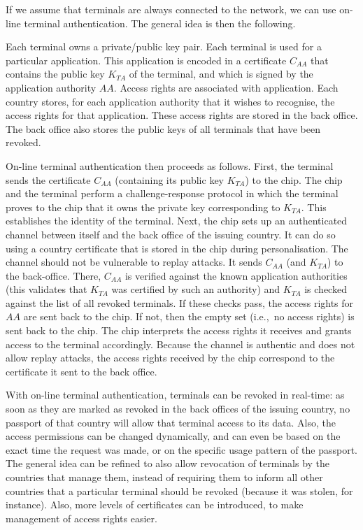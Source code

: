 \documentclass[runningheads,envcountsame,envcountsect,oribibl]{llncs}
\newcommand{\ie}{{i.e.},\ }		\newcommand{\eg}{{e.g.},\ }		\newcommand{\etal}{\textit{et al.}~}
\begin{document}
If we assume that terminals are always connected to the network, we can use
on-line terminal authentication. The general idea is then the following.

Each terminal owns a private/public key pair. Each terminal is used for a
particular application. This application is encoded in a certificate $C_{AA}$
that contains the public key $K_{TA}$ of the terminal, and which is signed by
the application authority $AA$. Access rights are associated with
application. Each country stores, for each application authority that it wishes
to recognise, the access rights for that application. These access rights are
stored in the back office. The back office also stores the public keys of all
terminals that have been revoked.

On-line terminal authentication then proceeds as follows.  First, the terminal
sends the certificate $C_{AA}$ (containing its public key $K_{TA}$) to the
chip.  The 
chip and the terminal perform a challenge-response protocol in which the
terminal proves to the chip that it owns the private key corresponding to
$K_{TA}$. This establishes the identity of the terminal.  Next, the chip sets
up an authenticated channel between itself and the back office of the issuing
country. It can do so using a country certificate that is stored in the chip
during personalisation. The channel should not be vulnerable to replay attacks.
It sends $C_{AA}$ (and $K_{TA}$) 
to the back-office. There, $C_{AA}$ is verified against the known application
authorities (this validates that $K_{TA}$ was certified by such
an authority) and
$K_{TA}$ is checked against the list of all revoked
terminals. If these checks pass, the access rights for $AA$ are sent back to
the chip. If not, then the empty set (\ie no access rights) is sent back to
the chip.
The chip interprets the access rights it receives and grants access to the
terminal accordingly. Because the channel is authentic and does not allow
replay attacks, the access rights received by the chip correspond to the
certificate it sent to the back office.


With on-line terminal authentication, terminals can be revoked in real-time: as
soon as they are marked as revoked in the back offices of the issuing country,
no passport of that country will allow that terminal access to its data.
Also, the access permissions can be changed dynamically, and can even be based
on the exact time the request was made, or on the specific usage pattern of the
passport.
The general idea can be refined to also allow revocation of terminals by the
countries that manage them, instead of requiring them to inform all other
countries that a particular terminal should be revoked (because it was stolen,
for instance).
Also, more levels of certificates can be introduced, to make management of 
access rights easier. 
\end{document}
